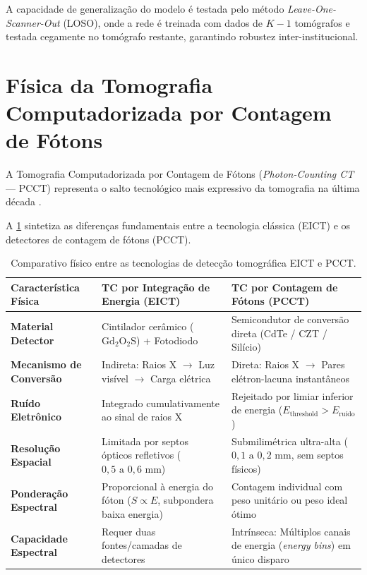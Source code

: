 A capacidade de generalização do modelo é testada pelo método \emph{Leave-One-Scanner-Out} (LOSO), onde a rede é treinada com dados de $K - 1$ tomógrafos e testada cegamente no tomógrafo restante, garantindo robustez inter-institucional.

\section{Física da Tomografia Computadorizada por Contagem de Fótons}
\label{sec:pcct_fisica}

A Tomografia Computadorizada por Contagem de Fótons (\emph{Photon-Counting CT} --- PCCT) representa o salto tecnológico mais expressivo da tomografia na última década \cite{flohr2020, mccollough2026, pimenta2025, pimenta2026}.

A \cref{tab:eict_vs_pcct} sintetiza as diferenças fundamentais entre a tecnologia clássica (EICT) e os detectores de contagem de fótons (PCCT).

\begin{table}[htbp]
  \centering
  \small
  \caption{Comparativo físico entre as tecnologias de detecção tomográfica EICT e PCCT.}
  \label{tab:eict_vs_pcct}
  \begin{tabularx}{\textwidth}{lXX}
    \toprule
    \textbf{Característica Física} & \textbf{TC por Integração de Energia (EICT)} & \textbf{TC por Contagem de Fótons (PCCT)} \\
    \midrule
    \textbf{Material Detector} & Cintilador cerâmico ($\text{Gd}_2\text{O}_2\text{S}$) + Fotodiodo & Semicondutor de conversão direta (CdTe / CZT / Silício) \\
    \textbf{Mecanismo de Conversão} & Indireta: Raios X $\to$ Luz visível $\to$ Carga elétrica & Direta: Raios X $\to$ Pares elétron-lacuna instantâneos \\
    \textbf{Ruído Eletrônico} & Integrado cumulativamente ao sinal de raios X & Rejeitado por limiar inferior de energia ($E_{\text{threshold}} > E_{\text{ruído}}$) \\
    \textbf{Resolução Espacial} & Limitada por septos ópticos refletivos ($0{,}5 \text{ a } 0{,}6 \text{ mm}$) & Submilimétrica ultra-alta ($0{,}1 \text{ a } 0{,}2 \text{ mm}$, sem septos físicos) \\
    \textbf{Ponderação Espectral} & Proporcional à energia do fóton ($S \propto E$, subpondera baixa energia) & Contagem individual com peso unitário ou peso ideal ótimo \\
    \textbf{Capacidade Espectral} & Requer duas fontes/camadas de detectores & Intrínseca: Múltiplos canais de energia (\emph{energy bins}) em único disparo \\
    \bottomrule
  \end{tabularx}
\end{table}

